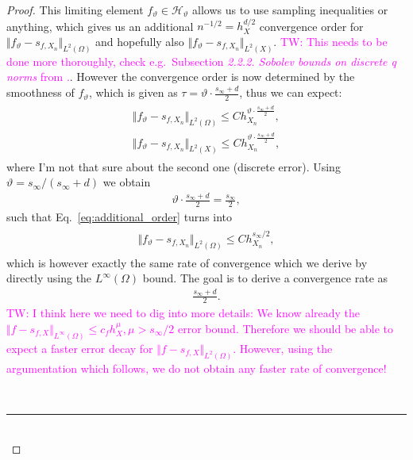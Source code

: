 \documentclass[a4paper, 10pt]{article}
\newcommand{\Ht}{\mathcal{H}_{\vartheta}}
\newcommand{\tw}[1]{\textcolor{magenta}{TW: #1}}
\begin{document}
\begin{proof}
This limiting element $f_\vartheta \in \Ht$ allows us to use sampling inequalities or anything, which gives us an additional $n^{-1/2} = h_X^{d/2}$ convergence order for $\Vert f_\vartheta - s_{f, X_n} \Vert_{L^2(\Omega)}$ and hopefully also $\Vert f_\vartheta - s_{f, X_n} \Vert_{L^2(X)}$. 
\tw{This needs to be done more thoroughly, check e.g.\ Subsection \textit{2.2.2. Sobolev bounds on discrete q norms} from \cite{narcowich2005sobolev}.}.
However the convergence order is now determined by the smoothness of $f_\vartheta$, 
which is given as $\tau = \vartheta \cdot \frac{s_\infty + d}{2}$, 
thus we can expect:
\begin{align}
\begin{aligned}
\label{eq:additional_order}
\Vert f_\vartheta - s_{f, X_n} \Vert_{L^2(\Omega)} \leq C h_{X_n}^{\vartheta \cdot \frac{s_\infty + d}{2}}, \\
\Vert f_\vartheta - s_{f, X_n} \Vert_{L^2(X)} \leq C h_{X_n}^{\vartheta \cdot \frac{s_\infty + d}{2}},
\end{aligned}
\end{align}
where I'm not that sure about the second one (discrete error).
Using $\vartheta = s_\infty / (s_\infty + d)$ we obtain 
\begin{align*}
\vartheta \cdot \frac{s_\infty + d}{2} = \frac{s_\infty}{2},
\end{align*}
such that Eq.\ \eqref{eq:additional_order} turns into
\begin{align}
\begin{aligned}
\label{eq:additional_order}
\Vert f_\vartheta - s_{f, X_n} \Vert_{L^2(\Omega)} \leq C h_{X_n}^{s_\infty / 2},
%
\end{aligned}
\end{align}
which is however exactly the same rate of convergence which we derive by directly using the $L^\infty(\Omega)$ bound.
The goal is to derive a convergence rate as
\begin{align*}
\frac{s_\infty + d}{2}.
\end{align*}
\tw{I think here we need to dig into more details:
We know already the $\Vert f - s_{f, X} \Vert_{L^\infty(\Omega)} \leq c_f h_X^\mu, \mu > s_\infty/2$ error bound.
Therefore we should be able to expect a faster error decay for $\Vert f - s_{f, X} \Vert_{L^2(\Omega)}$.
However, using the argumentation which follows, we do not obtain any faster rate of convergence!}

~ \\
\hrule
~ \\


\end{proof}
\end{document}
